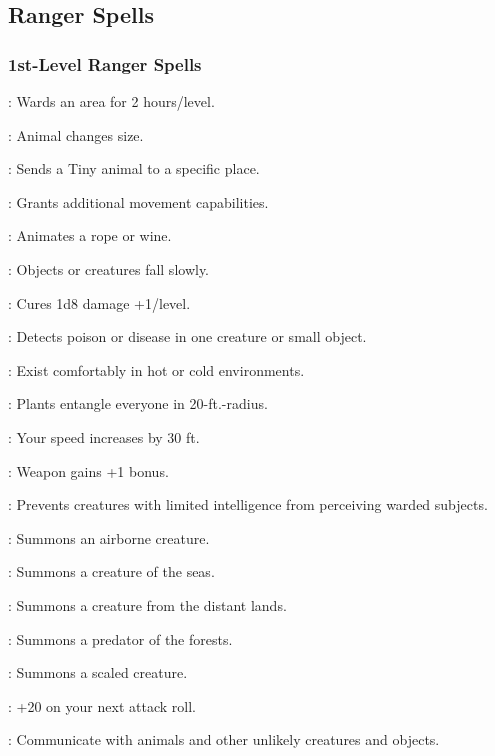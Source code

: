 \subsection{Ranger Spells}
\subsubsection{1st-Level Ranger Spells}
\begin{list}{}{\leftmargin=1em}
\item {}: Wards an area for 2 hours/level.
\item {}: Animal changes size.
\item {}: Sends a Tiny animal to a specific place.
\item {}: Grants additional movement capabilities.
\item {}: Animates a rope or wine.
\item {}: Objects or creatures fall slowly.
\item {}: Cures 1d8 damage +1/level.
\item {}: Detects poison or disease in one creature or small object.
\item {}: Exist comfortably in hot or cold environments.
\item {}: Plants entangle everyone in 20-ft.-radius.
\item {}: Your speed increases by 30 ft.
\item {}: Weapon gains +1 bonus.
\item {}: Prevents creatures with limited intelligence from perceiving warded subjects.
\item {}: Summons an airborne creature.
\item {}: Summons a creature of the seas.
\item {}: Summons a creature from the distant lands.
\item {}: Summons a predator of the forests.
\item {}: Summons a scaled creature.
\item {}: +20 on your next attack roll.
\item {}: Communicate with animals and other unlikely creatures and objects.
\end{list}
